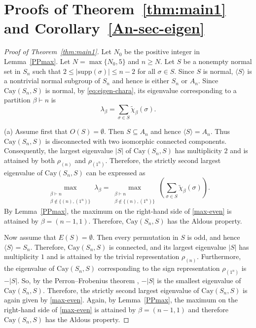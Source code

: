 \documentclass[12pt, a4paper]{article}
\theoremstyle{definition}
\begin{document}
\section{Proofs of Theorem~\ref{thm:main1} and Corollary~\ref{An-sec-eigen}}
\label{supp-small}



\begin{proof}[Proof of Theorem~\ref{thm:main1}]
Let $N_0$ be the positive integer in Lemma~\ref{PPmax}. Let $N = \max\{N_0, 5\}$ and $n\ge N$. Let $S$ be a nonempty normal set in $S_n$ such that $2 \le |\mathrm{supp}(\sigma)| \le n-2$ for all  $\sigma\in S$. Since $S$ is normal, $\langle S\rangle$ is a nontrivial normal subgroup of $S_n$ and hence is either $S_n$ or $A_n$. Since $\mathrm{Cay}(S_n,S)$ is normal, by \eqref{eq:eigen-chara}, its eigenvalue corresponding to a partition $\beta\vdash n$ is
\[
\lambda_\beta
=
\sum_{\sigma \in S} \tilde{\chi}_\beta(\sigma).
\]

(a) Assume first that $O(S)=\emptyset$. Then $S\subseteq A_n$ and hence $\langle S\rangle=A_n$. Thus $\mathrm{Cay}(S_n,S)$ is disconnected with two isomorphic connected components. Consequently, the largest eigenvalue $|S|$ of $\mathrm{Cay}(S_n,S)$ has multiplicity $2$ and is attained by both $\rho_{(n)}$ and $\rho_{(1^n)}$. Therefore, the strictly second largest eigenvalue of $\mathrm{Cay}(S_n,S)$ can be expressed as
\begin{equation}\label{max-even}
\max_{\substack{\beta\vdash n\\ \beta\notin\{(n),(1^n)\}}}\lambda_\beta
=
\max_{\substack{\beta\vdash n\\ \beta\notin\{(n),(1^n)\}}}
\left(
\sum_{\sigma \in S} \tilde{\chi}_\beta(\sigma)
\right).
\end{equation}
By Lemma~\ref{PPmax}, the maximum on the right-hand side of \eqref{max-even} is attained by $\beta=(n-1,1)$. Therefore, $\mathrm{Cay}(S_n, S)$ has the Aldous property.

Now assume that $E(S)=\emptyset$. Then every permutation in $S$ is odd, and hence $\langle S\rangle=S_n$. Therefore, $\mathrm{Cay}(S_n, S)$ is connected, and its largest eigenvalue $|S|$ has multiplicity $1$ and is attained by the trivial representation $\rho_{(n)}$.
Furthermore, the eigenvalue of $\mathrm{Cay}(S_n, S)$ corresponding to the sign representation $\rho_{(1^n)}$ is $-|S|$. So, by the Perron--Frobenius theorem \cite[Theorem 8.4.4]{HJ1}, $-|S|$ is the smallest eigenvalue of $\mathrm{Cay}(S_n, S)$. Therefore, the strictly second largest eigenvalue of $\mathrm{Cay}(S_n, S)$ is again given by \eqref{max-even}. Again, by Lemma~\ref{PPmax}, the maximum on the right-hand side of \eqref{max-even} is attained by $\beta=(n-1,1)$ and therefore $\mathrm{Cay}(S_n, S)$ has the Aldous property.


\end{proof}
\end{document}
